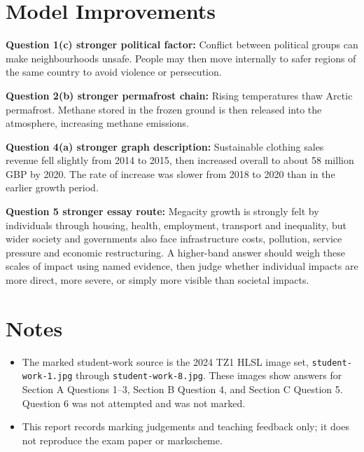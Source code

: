 \documentclass[11pt]{article}
\begin{document}
\section*{Model Improvements}

\textbf{Question 1(c) stronger political factor:}
Conflict between political groups can make neighbourhoods unsafe. People may then move internally to safer regions of the same country to avoid violence or persecution.

\textbf{Question 2(b) stronger permafrost chain:}
Rising temperatures thaw Arctic permafrost. Methane stored in the frozen ground is then released into the atmosphere, increasing methane emissions.

\textbf{Question 4(a) stronger graph description:}
Sustainable clothing sales revenue fell slightly from 2014 to 2015, then increased overall to about 58 million GBP by 2020. The rate of increase was slower from 2018 to 2020 than in the earlier growth period.

\textbf{Question 5 stronger essay route:}
Megacity growth is strongly felt by individuals through housing, health, employment, transport and inequality, but wider society and governments also face infrastructure costs, pollution, service pressure and economic restructuring. A higher-band answer should weigh these scales of impact using named evidence, then judge whether individual impacts are more direct, more severe, or simply more visible than societal impacts.

\section*{Notes}

\begin{itemize}
  \item The marked student-work source is the 2024 TZ1 HLSL image set, \texttt{student-work-1.jpg} through \texttt{student-work-8.jpg}. These images show answers for Section A Questions 1--3, Section B Question 4, and Section C Question 5. Question 6 was not attempted and was not marked.
  \item This report records marking judgements and teaching feedback only; it does not reproduce the exam paper or markscheme.
\end{itemize}
\end{document}
